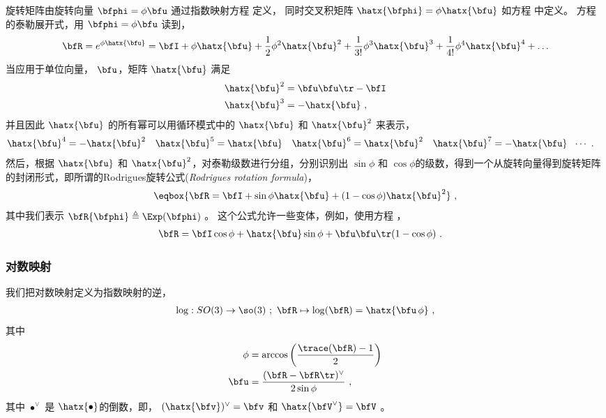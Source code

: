 旋转矩阵由旋转向量 $\bfphi=\phi\bfu$ 通过指数映射方程  定义，
同时交叉积矩阵 $\hatx{\bfphi}=\phi\hatx{\bfu}$ 如方程  中定义。
方程  的泰勒展开式，用 $\bfphi=\phi\bfu$ 读到， 
%
\begin{align}
\bfR=e^{\phi\hatx{\bfu}} = 
	  \bfI 
	+ 			\phi\hatx{\bfu} 
	+ \frac12	\phi^2\hatx{\bfu}^2
	+ \frac1{3!}\phi^3\hatx{\bfu}^3 
	+ \frac1{4!}\phi^4\hatx{\bfu}^4 
	+ \dots
\end{align}
%
当应用于单位向量， $\bfu$，矩阵 $\hatx{\bfu}$ 满足
%
%
\begin{align}
\hatx{\bfu}^2 &= \bfu\bfu\tr-\bfI
\label{equ:prop1}
\\
\hatx{\bfu}^3 &= -\hatx{\bfu}
~, \label{equ:prop2}
\end{align}%
%
并且因此 $\hatx{\bfu}$ 的所有幂可以用循环模式中的 $\hatx{\bfu}$ 和 $\hatx{\bfu}^2$ 来表示，
%
\begin{align}
\hatx{\bfu}^4 &= -\hatx{\bfu}^2 
& \hatx{\bfu}^5 &= \hatx{\bfu} 
& \hatx{\bfu}^6 &= \hatx{\bfu}^2 
& \hatx{\bfu}^7 &=-\hatx{\bfu} 
~~\cdots 
~.
\end{align}
%
然后，根据 $\hatx{\bfu}$ 和 $\hatx{\bfu}^2$，对泰勒级数进行分组，分别识别出 $\sin\phi$ 和 $\cos\phi$的级数，得到一个从旋转向量得到旋转矩阵的封闭形式，即所谓的Rodrigues旋转公式(\emph{Rodrigues rotation formula})，
%
\begin{align}
\eqbox{
\bfR %
= \bfI + \sin\phi\hatx{\bfu} + (1-\cos\phi)\hatx{\bfu}^2
}~, \label{equ:rodrigues}
\end{align}%
%
其中我们表示 $\bfR\{\bfphi\}\triangleq\Exp(\bfphi)$ 。
这个公式允许一些变体，例如，使用方程  ，
%
\begin{align}
\bfR &= \bfI\cos\phi + \hatx{\bfu}\sin\phi + \bfu\bfu\tr(1-\cos\phi)
~.
\end{align}%

\subsubsection{对数映射}

我们把对数映射定义为指数映射的逆，
%
\begin{align}
\log : SO(3)\to\so(3)~;~ \bfR \mapsto \log(\bfR)=\hatx{\bfu\,\phi}
~,
\end{align}
%
其中
%
\begin{align}
\phi &= \arccos\left(\frac{\trace(\bfR)-1}{2}\right) 
\\
\bfu &= \frac{(\bfR-\bfR\tr)^\vee}{2\sin\phi} 
~,
\end{align}
%
其中 $\bullet^\vee$ 是 $\hatx{\bullet}$的倒数，即， $(\hatx{\bfv})^\vee=\bfv$ 和 $\hatx{\bfV^\vee}=\bfV$ 。

